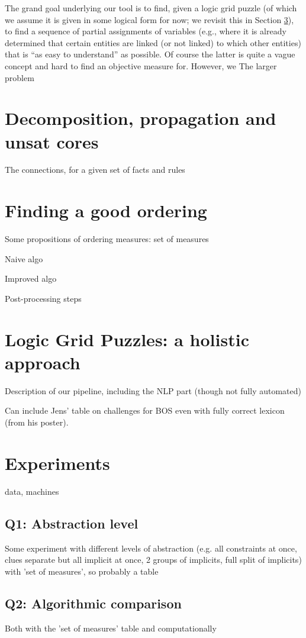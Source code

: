 \documentclass{ecai}
\begin{document}
The grand goal underlying our tool is to find, given a logic grid puzzle (of which we assume it is given in some logical form for now; we revisit this in Section \ref{sec:holistic}), to find a sequence of partial assignments of variables (e.g., where it is already determined that certain entities are linked (or not linked) to which other entities) that is ``as easy to understand'' as possible.  
Of course the latter is quite a vague concept and hard to find an objective measure for. However, we 
The larger problem

\section{Decomposition, propagation and unsat cores}
The connections, for a given set of facts and rules

\section{Finding a good ordering}
Some propositions of ordering measures: set of measures

Naive algo

Improved algo

Post-processing steps

\section{Logic Grid Puzzles: a holistic approach}\label{sec:holistic}
Description of our pipeline, including the NLP part (though not fully automated)

Can include Jens' table on challenges for BOS even with fully correct lexicon (from his poster).

\section{Experiments}

data, machines

\subsection{Q1: Abstraction level}
Some experiment with different levels of abstraction (e.g. all constraints at once, clues separate but all implicit at once, 2 groups of implicits, full split of implicits)
with 'set of measures', so probably a table

\subsection{Q2: Algorithmic comparison}
Both with the 'set of measures' table and computationally
\end{document}
